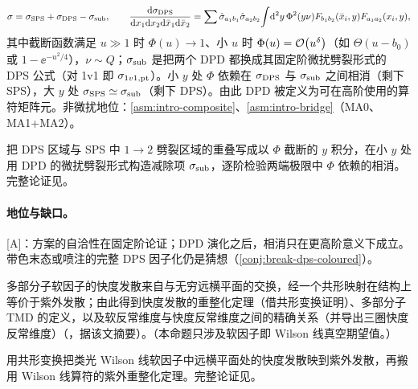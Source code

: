 \begin{proposition}\label{prop:front-dps-scheme}
\begin{equation}\label{eq:front-dgs}
\sigma=\sigma_{\rm SPS}+\sigma_{\rm DPS}-\sigma_{\rm sub},\qquad
\frac{\mathrm{d}\sigma_{\rm DPS}}{\mathrm{d} x_1\mathrm{d} x_2\mathrm{d}\bar x_1\mathrm{d}\bar x_2}=\sum\hat\sigma_{a_1b_1}\hat\sigma_{a_2b_2}\!\int\!\mathrm{d}^2y\,\Phi^2(y\nu)F_{b_1b_2}(\bar x_i,y)F_{a_1a_2}(x_i,y),
\end{equation}
其中截断函数满足 $u\gg1$ 时 $\Phi(u)\to1$、小 $u$ 时 $\Phi(u)=\mathcal{O}\!\left(u^\delta\right)$（如 $\Theta(u-b_0)$ 或 $1-\ee^{-u^2/4}$），$\nu\sim Q$；$\sigma_{\rm sub}$ 是把两个 DPD 都换成其固定阶微扰劈裂形式的 DPS 公式（对 1v1 即 $\sigma_{1v1,{\rm pt}}$）。小 $y$ 处 $\Phi$ 依赖在 $\sigma_{\rm DPS}$ 与 $\sigma_{\rm sub}$ 之间相消（剩下 SPS），大 $y$ 处 $\sigma_{\rm SPS}\simeq\sigma_{\rm sub}$（剩下 DPS）。由此 DPD 被定义为可在高阶使用的算符矩阵元\cite[第~4.1~节]{Diehl:2017kgu}。非微扰地位：\cref{asm:intro-composite}、\cref{asm:intro-bridge}（MA0、MA1+MA2）。
\end{proposition}

\begin{proofsketch}
把 DPS 区域与 SPS 中 $1\to2$ 劈裂区域的重叠写成以 $\Phi$ 截断的 $y$ 积分，在小 $y$ 处用 DPD 的微扰劈裂形式构造减除项 $\sigma_{\rm sub}$，逐阶检验两端极限中 $\Phi$ 依赖的相消。完整论证见\cite[第~4~节]{Diehl:2017kgu}。
\end{proofsketch}

\paragraph{地位与缺口。}[A]：方案的自洽性在固定阶论证；DPD 演化之后，相消只在更高阶意义下成立。带色末态或喷注的完整 DPS 因子化仍是猜想（\cref{conj:break-dps-coloured}）。

\begin{proposition}\label{prop:front-rapidity-renorm}
多部分子软因子的快度发散来自与无穷远横平面的交换，经一个共形映射在结构上等价于紫外发散；由此得到快度发散的重整化定理（借共形变换证明）、多部分子 TMD 的定义，以及软反常维度与快度反常维度之间的精确关系（并导出三圈快度反常维度）（\cite{Vladimirov:2017ksc}，据该文摘要）。（本命题只涉及软因子即 Wilson 线真空期望值。）
\end{proposition}

\begin{proofsketch}
用共形变换把类光 Wilson 线软因子中远横平面处的快度发散映到紫外发散，再搬用 Wilson 线算符的紫外重整化定理。完整论证见\cite{Vladimirov:2017ksc}。
\end{proofsketch}

